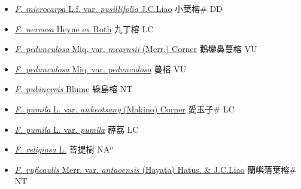 \begin{itemize}
\begin{itemize}
        \item[] \href{http://www.theplantlist.org/tpl1.1/search?q=Ficus+microcarpa+var.+pusillifolia}{\textit{F. microcarpa} L.f. var. \textit{pusillifolia} J.C.Liao}   小葉榕\# DD
        \item[] \href{http://www.theplantlist.org/tpl1.1/search?q=Ficus+nervosa}{\textit{F. nervosa} Heyne ex Roth}   九丁榕 LC
        \item[] \href{http://www.theplantlist.org/tpl1.1/search?q=Ficus+pedunculosa+var.+mearnsii}{\textit{F. pedunculosa} Miq. var. \textit{mearnsii} (Merr.) Corner}   鵝鑾鼻蔓榕 VU
        \item[] \href{http://www.theplantlist.org/tpl1.1/search?q=Ficus+pedunculosa+var.+pedunculosa}{\textit{F. pedunculosa} Miq. var. \textit{pedunculosa}}   蔓榕 VU
        \item[] \href{http://www.theplantlist.org/tpl1.1/search?q=Ficus+pubinervis}{\textit{F. pubinervis} Blume}   綠島榕 NT
        \item[] \href{http://www.theplantlist.org/tpl1.1/search?q=Ficus+pumila+var.+awkeotsang}{\textit{F. pumila} L. var. \textit{awkeotsang} (Makino) Corner}   愛玉子\# LC
        \item[] \href{http://www.theplantlist.org/tpl1.1/search?q=Ficus+pumila+var.+pumila}{\textit{F. pumila} L. var. \textit{pumila}}   薜荔 LC
        \item[] \href{http://www.theplantlist.org/tpl1.1/search?q=Ficus+religiosa}{\textit{F. religiosa} L.}   菩提樹 NA$^n$
        \item[] \href{http://www.theplantlist.org/tpl1.1/search?q=Ficus+ruficaulis+var.+antaoensis}{\textit{F. ruficaulis} Merr. var. \textit{antaoensis} (Hayata) Hatus. \& J.C.Liao}   蘭嶼落葉榕\# NT

\end{itemize}
\end{itemize}
